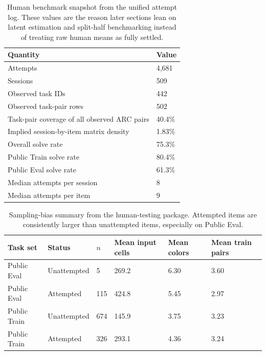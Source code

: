 \begin{table}[H]
\centering
\small
\caption{Human benchmark snapshot from the unified attempt log. These values are the reason later sections lean on latent estimation and split-half benchmarking instead of treating raw human means as fully settled.}
\begin{tabular}{p{3.2in}p{1.5in}}
\toprule
\textbf{Quantity} & \textbf{Value} \\
\midrule
Attempts & 4,681 \\
Sessions & 509 \\
Observed task IDs & 442 \\
Observed task-pair rows & 502 \\
Task-pair coverage of all observed ARC pairs & 40.4\% \\
Implied session-by-item matrix density & 1.83\% \\
Overall solve rate & 75.3\% \\
Public Train solve rate & 80.4\% \\
Public Eval solve rate & 61.3\% \\
Median attempts per session & 8 \\
Median attempts per item & 9 \\
\bottomrule
\end{tabular}
\end{table}

\begin{table}[H]
\centering
\scriptsize
\caption{Sampling-bias summary from the human-testing package. Attempted items are consistently larger than unattempted items, especially on Public Eval.}
\begin{tabular}{p{1.0in}p{0.9in}p{0.55in}p{0.8in}p{0.8in}p{0.8in}}
\toprule
\textbf{Task set} & \textbf{Status} & \textbf{$n$} & \textbf{Mean input cells} & \textbf{Mean colors} & \textbf{Mean train pairs} \\
\midrule
Public Eval & Unattempted & 5 & 269.2 & 6.30 & 3.60 \\
Public Eval & Attempted & 115 & 424.8 & 5.45 & 2.97 \\
Public Train & Unattempted & 674 & 145.9 & 3.75 & 3.23 \\
Public Train & Attempted & 326 & 293.1 & 4.36 & 3.24 \\
\bottomrule
\end{tabular}
\end{table}

